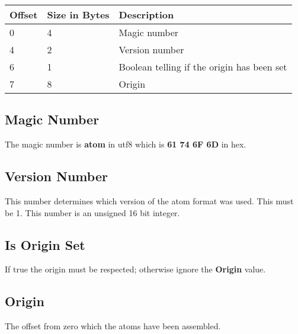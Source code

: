 \begin{table}[h]
    \centering
    \label{tbl:header}
    \begin{tabular}{|l|l|l|}
        \hline
        \textbf{Offset} & \textbf{Size in Bytes} & \textbf{Description}                         \\ \hline
        0               & 4                      & Magic number                                 \\ \hline
        4               & 2                      & Version number                               \\ \hline
        6               & 1                      & Boolean telling if the origin has been set   \\ \hline
        7               & 8                      & Origin                                       \\ \hline
    \end{tabular}
\end{table}

\subsection{Magic Number}
The magic number is \textbf{atom} in utf8 which is \textbf{61 74 6F 6D} in hex.

\subsection{Version Number}
This number determines which version of the atom format was used. This must be 
1. This number is an unsigned 16 bit integer.

\subsection{Is Origin Set}
If true the origin must be respected; otherwise ignore the \textbf{Origin} 
value.

\subsection{Origin}
The offset from zero which the atoms have been assembled.